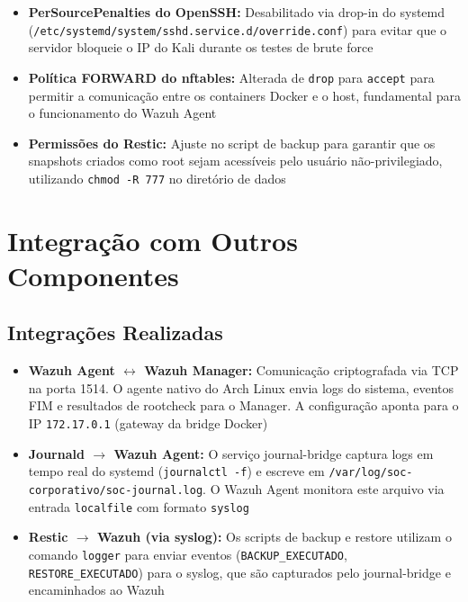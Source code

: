 \documentclass[12pt,a4paper]{article}
\begin{document}
    \begin{itemize}
        \item \textbf{PerSourcePenalties do OpenSSH:} Desabilitado via drop-in do systemd (\texttt{/etc/systemd/system/sshd.service.d/override.conf}) para evitar que o servidor bloqueie o IP do Kali durante os testes de brute force
        \item \textbf{Política FORWARD do nftables:} Alterada de \texttt{drop} para \texttt{accept} para permitir a comunicação entre os containers Docker e o host, fundamental para o funcionamento do Wazuh Agent
        \item \textbf{Permissões do Restic:} Ajuste no script de backup para garantir que os snapshots criados como root sejam acessíveis pelo usuário não-privilegiado, utilizando \texttt{chmod -R 777} no diretório de dados
    \end{itemize}

    \newpage
    \section{Integração com Outros Componentes}

    \subsection{Integrações Realizadas}

    \begin{itemize}
        \item \textbf{Wazuh Agent $\leftrightarrow$ Wazuh Manager:} Comunicação criptografada via TCP na porta 1514. O agente nativo do Arch Linux envia logs do sistema, eventos FIM e resultados de rootcheck para o Manager. A configuração aponta para o IP \texttt{172.17.0.1} (gateway da bridge Docker)
        \item \textbf{Journald $\rightarrow$ Wazuh Agent:} O serviço journal-bridge captura logs em tempo real do systemd (\texttt{journalctl -f}) e escreve em \texttt{/var/log/soc-corporativo/soc-journal.log}. O Wazuh Agent monitora este arquivo via entrada \texttt{localfile} com formato \texttt{syslog}
        \item \textbf{Restic $\rightarrow$ Wazuh (via syslog):} Os scripts de backup e restore utilizam o comando \texttt{logger} para enviar eventos (\texttt{BACKUP\_EXECUTADO}, \texttt{RESTORE\_EXECUTADO}) para o syslog, que são capturados pelo journal-bridge e encaminhados ao Wazuh
    \end{itemize}
\end{document}
